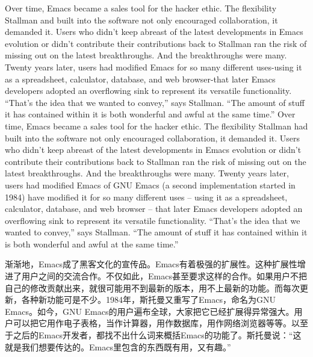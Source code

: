 \ifdefined\eng
\ifdefined\vone
Over time, Emacs became a sales tool for the hacker ethic. The flexibility Stallman and built into the software not only encouraged collaboration, it demanded it. Users who didn't keep abreast of the latest developments in Emacs evolution or didn't contribute their contributions back to Stallman ran the risk of missing out on the latest breakthroughs. And the breakthroughs were many. Twenty years later, users had modified Emacs for so many different uses-using it as a spreadsheet, calculator, database, and web browser-that later Emacs developers adopted an overflowing sink to represent its versatile functionality. ``That's the idea that we wanted to convey,'' says Stallman. ``The amount of stuff it has contained within it is both wonderful and awful at the same time.''
\fi
\ifdefined\vtwo
Over time, Emacs became a sales tool for the hacker ethic. The flexibility Stallman had built into the software not only encouraged collaboration, it demanded it. Users who didn't keep abreast of the latest developments in Emacs evolution or didn't contribute their contributions back to Stallman ran the risk of missing out on the latest breakthroughs. And the breakthroughs were many. Twenty years later, users \ifdefined\vone had modified Emacs \fi\ifdefined\vtwo of GNU Emacs (a second implementation started in 1984) have modified \fi it for so many different uses -- using it as a spreadsheet, calculator, database, and web browser -- that later Emacs developers adopted an overflowing sink to represent its versatile functionality. ``That's the idea that we wanted to convey,'' says Stallman. ``The amount of stuff it has contained within it is both wonderful and awful at the same time.''
\fi
\fi

\ifdefined\chs
渐渐地，Emacs成了黑客文化的宣传品。Emacs有着极强的扩展性。这种扩展性增进了用户之间的交流合作。不仅如此，Emacs甚至要求这样的合作。如果用户不把自己的修改贡献出来，就很可能用不到最新的版本，用不上最新的功能。而每次更新，各种新功能可是不少。\ifdefined\vtwo 1984年，斯托曼又重写了Emacs，命名为GNU Emacs。\fi 如今，GNU Emacs的用户遍布全球，大家把它已经扩展得异常强大。用户可以把它用作电子表格，当作计算器，用作数据库，用作网络浏览器等等。以至于之后的Emacs开发者，都找不出什么词来概括Emacs的功能了。斯托曼说：``这就是我们想要传达的。Emacs里包含的东西既有用，又有趣。''
\fi

